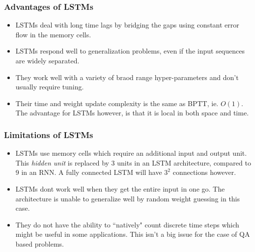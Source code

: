 \documentclass[a4paper,12pt]{report}
\begin{document}
            \subsubsection{Advantages of LSTMs}
                \begin{itemize}
                    \item LSTMs deal with long time lags by bridging the gaps using constant error flow in the memory cells.
                    \item LSTMs respond well to generalization problems, even if the input sequences are widely separated.
                    \item They work well with a variety of braod range hyper-parameters and don't usually require tuning.
                    \item Their time and weight update complexity is the same as BPTT, ie. $ O(1) $. The advantage for LSTMs however, is that it is local in both space and time.
                \end{itemize}

            \subsubsection{Limitations of LSTMs}
                \begin{itemize}
                    \item LSTMs use memory cells which require an additional input and output unit. This \textit{hidden unit} is replaced by 3 units in an LSTM architecture, compared to 9 in an RNN. A fully connected LSTM will have $ 3^{2} $ connections however.
                    \item LSTMs dont work well when they get the entire input in one go. The architecture is unable to generalize well by random weight guessing in this case.
                    \item They do not have the ability to ``natively" count discrete time steps which might be useful in some applications. This isn't a big issue for the case of QA based problems.
                \end{itemize}
\end{document}
